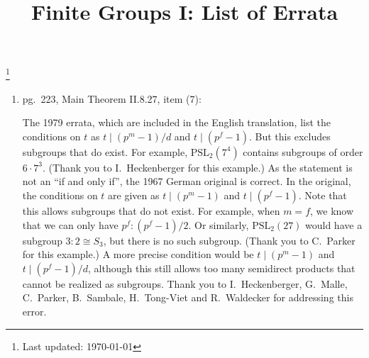\documentclass[12pt]{amsart}
\theoremstyle{plain}
\theoremstyle{definition}
\newcommand{\mr}[1]{\mathrm{#1}}
\begin{document}
 
\title{Finite Groups I: List of Errata}

 
\thanks{Last updated: \today}

 


\maketitle


\begin{enumerate}[label=\arabic*.]
    \item pg.~223, Main Theorem II.8.27, item (7): 
    
    The 1979 errata, which are included in the English translation, list the conditions on $t$ as $t \mid (p^m-1)/d$ and $t \mid (p^f-1)$. But this excludes subgroups that do exist. For example, $\mr{PSL}_2(7^4)$ contains subgroups of order $6\cdot 7^3$. (Thank you to I.~Heckenberger for this example.) As the statement is not an ``if and only if'', the 1967 German original is correct. In the original, the conditions on $t$ are given as $t \mid (p^m-1)$ and $t \mid (p^f-1)$. Note that this allows subgroups that do not exist. For example, when $m=f$, we know that we can only have $p^f:(p^f-1)/2$.  Or similarly, $\mr{PSL}_2(27)$ would have a subgroup $3:2\cong S_3$, but there is no such subgroup. (Thank you to C.~Parker for this example.) A more precise condition would be $t \mid (p^m-1)$ and $t \mid (p^f-1)/d$, although this still allows too many semidirect products that cannot be realized as subgroups.  Thank you to I.~Heckenberger, G.~Malle, C.~Parker, B.~Sambale, H.~Tong-Viet and R.~Waldecker for addressing this error.
\end{enumerate}
\end{document}
